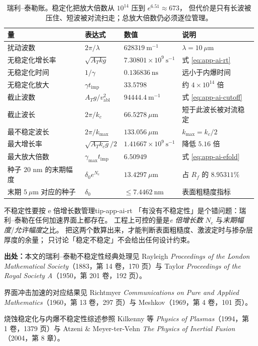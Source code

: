 \begin{table}[htbp]
\centering
\small
\caption{瑞利--泰勒账。稳定化把放大倍数从 $10^{14}$ 压到 $e^{6.51} \approx 673$，
但代价是只有长波被压住、短波被对流扫走；总放大倍数仍必须逐位管理。}
\label{tab:app-ai-rt}
\begin{tabular}{p{3.6cm}p{3.2cm}p{3.0cm}p{3.2cm}}
\toprule
量 & 表达式 & 数值 & 说明 \\
\midrule
扰动波数 & $2\pi/\lambda$ & $628319\ \mathrm{m^{-1}}$ & $\lambda = 10\ \mu$m \\
无稳定化增长率 & $\sqrt{A_T k g}$ & $7.30801\times10^{9}\ \mathrm{s^{-1}}$ & 式 \eqref{eq:app-ai-rt} \\
无稳定化时间 & $1/\gamma$ & $0.136836\ \mathrm{ns}$ & 远小于内爆时间 \\
无稳定化放大 & $\gamma t_{\mathrm{imp}}$ & $33.5798$ & 约 $4\times10^{14}$ 倍 \\
截止波数 & $A_T g/v_{\mathrm{abl}}^2$ & $94444.4\ \mathrm{m^{-1}}$ & 式 \eqref{eq:app-ai-cutoff} \\
截止波长 & $2\pi/k_c$ & $66.5278\ \mu$m & 短于此波长被对流稳定 \\
最不稳定波长 & $2\pi/k_{\max}$ & $133.056\ \mu$m & $k_{\max} = k_c/2$ \\
最大增长率 & $\sqrt{A_T k_c g}/2$ & $1.41667\times10^{9}\ \mathrm{s^{-1}}$ & 降低 $5.16$ 倍 \\
最大放大倍数 & $\gamma_{\max}t_{\mathrm{imp}}$ & $6.50949$ & 式 \eqref{eq:app-ai-efold} \\
种子 $20$ nm 的末期幅度 & $\delta_0 e^{N_e}$ & $13.4297\ \mu$m & 占 $R_f$ 的 $8.95311\%$ \\
末期 $5\ \mu$m 对应的种子 & $\delta_0$ & $\le 7.4462\ \mathrm{nm}$ & 表面粗糙度指标 \\
\bottomrule
\end{tabular}

\end{table}

\begin{tip}{不稳定性要按 e 倍增长数管理}{tip-app-ai-rt}
「有没有不稳定性」是个错问题：瑞利--泰勒在任何加速界面上都存在。
工程上可控的量是\emph{e 倍增长数} $N_e$ 与\emph{末期幅度}/\emph{允许幅度}之比。
把这两个数算出来，才能判断表面粗糙度、激波定时与掺杂层厚度的余量；
只讨论「稳定不稳定」不会给出任何设计约束。
\end{tip}

{\footnotesize
\textbf{出处：}本文的瑞利--泰勒不稳定性经典处理见 Rayleigh \emph{Proceedings of the London Mathematical Society}（1883，第 14 卷，170 页）与 Taylor \emph{Proceedings of the Royal Society A}（1950，第 201 卷，192 页）。

界面冲击加速的对应结果见 Richtmyer \emph{Communications on Pure and Applied Mathematics}（1960，第 13 卷，297 页）与 Meshkov（1969，第 4 卷，101 页）。

烧蚀稳定化与内爆不稳定性综述参照 Kilkenny 等 \emph{Physics of Plasmas}（1994，第 1 卷，1379 页）与 Atzeni \& Meyer-ter-Vehn \emph{The Physics of Inertial Fusion}（2004，第 8 章）。
}

